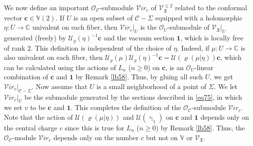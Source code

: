 \documentclass[12pt,b5paper,notitlepage]{report}
\theoremstyle{definition}
\theoremstyle{plain}
\newcommand{\fk}{\mathfrak}
\newcommand{\mc}{\mathcal}
\newcommand{\id}{\mathbf{1}}
\newcommand{\scr}{\mathscr}
\newcommand{\Vbb}{\mathbb V}
\newcommand{\Cbb}{\mathbb C}
\newcommand{\cbf}{\mathbf c}
\newcommand{\svir}{\mathcal V\!\mathit{ir}}
\numberwithin{equation}{section}
\begin{document}
We now define an important $\scr O_{\mc C}$-submodule $\svir_c$ \index{Virc@$\svir_c$} of $\scr V_{\fk X}^{\leq 2}$ related to the conformal vector $\cbf\in\Vbb(2)$.  If $U$ is an open subset of $\mc C-\Sigma$ equipped with a holomorphic $\eta:U\rightarrow\Cbb$ univalent on each fiber, then $\svir_c|_U$ is the  $\scr O_U$-submodule of $\scr V_{\fk X}|_U$ generated (freely) by $\mc U_\varrho(\eta)^{-1}\cbf$ and the vacuum section $\id$, which is locally free of rank $2$. This definition is independent of the choice of $\eta$. Indeed, if $\mu:U\rightarrow\Cbb$ is also univalent on each fiber, then $\mc U_\varrho(\mu)\mc U_\varrho(\eta)^{-1}\cbf=\mc U(\varrho(\mu|\eta))\cbf$, which can be calculated using the actions of $L_n$ ($n\geq 0$) on $\cbf$, is an $\scr O_U$-linear combination of $\cbf$ and $\id$ by Remark \ref{lb58}. Thus, by gluing all such $U$, we get $\svir_c|_{\mc C-\Sigma}$. Now assume that $U$ is a small neighborhood of a point of $\Sigma$. We let $\svir_c|_U$ be the submodule generated by the sections described in \eqref{eq75}, in which we set $v$ to be $\cbf$ and $\id$. This completes the definition of the $\scr O_{\mc C}$-submodule $\svir_c$. Note that the action of $\mc U(\varrho(\mu|\eta))$ and $\mc U(\upgamma_1)$ on $\cbf$ and $\id$ depends only on the central charge $c$ since this is true for $L_n$ ($n\geq 0$) by Remark \ref{lb58}. Thus, the $\scr O_{\mc C}$-module $\svir_c$ depends only on the number $c$ but not on $\Vbb$ or $\scr V_{\fk X}$.
\end{document}
